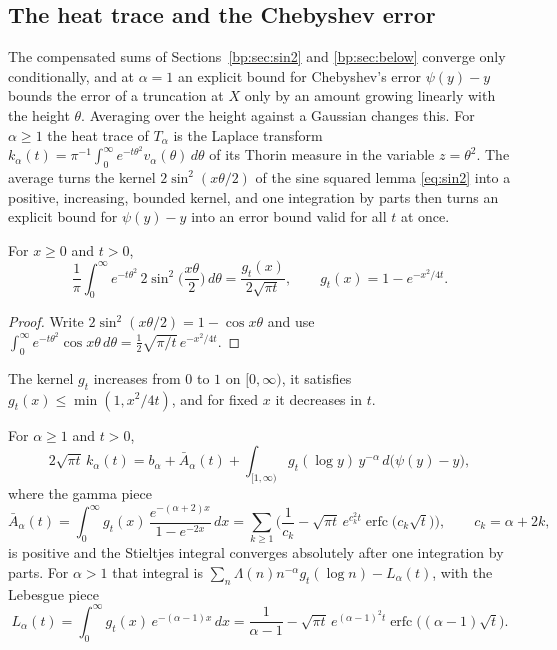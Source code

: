 \subsection{The heat trace and the Chebyshev error}\label{bp:sec:heat}

The compensated sums of Sections~\ref{bp:sec:sin2} and \ref{bp:sec:below} converge only conditionally, and at $\alpha=1$ an explicit bound for Chebyshev's error $\psi(y)-y$ bounds the error of a truncation at $X$ only by an amount growing linearly with the height $\theta$. Averaging over the height against a Gaussian changes this. For $\alpha\ge1$ the heat trace of $T_\alpha$ is the Laplace transform $k_\alpha(t)=\pi^{-1}\int_0^\infty e^{-t\theta^2}v_\alpha(\theta)\,d\theta$ of its Thorin measure in the variable $z=\theta^2$. The average turns the kernel $2\sin^2(x\theta/2)$ of the sine squared lemma \eqref{eq:sin2} into a positive, increasing, bounded kernel, and one integration by parts then turns an explicit bound for $\psi(y)-y$ into an error bound valid for all $t$ at once.

\begin{lemma}\label{bp:lem:gauss}
For $x\ge0$ and $t>0$,
\[
\frac1\pi\int_0^\infty e^{-t\theta^2}\,2\sin^2\Big(\frac{x\theta}2\Big)\,d\theta=\frac{g_t(x)}{2\sqrt{\pi t}},\qquad g_t(x)=1-e^{-x^2/4t}.
\]
\end{lemma}

\begin{proof}
Write $2\sin^2(x\theta/2)=1-\cos x\theta$ and use $\int_0^\infty e^{-t\theta^2}\cos x\theta\,d\theta=\frac12\sqrt{\pi/t}\,e^{-x^2/4t}$.
\end{proof}

The kernel $g_t$ increases from $0$ to $1$ on $[0,\infty)$, it satisfies $g_t(x)\le\min(1,x^2/4t)$, and for fixed $x$ it decreases in $t$.

\begin{proposition}\label{bp:prop:heat}
For $\alpha\ge1$ and $t>0$,
\begin{equation}\label{bp:eq:heat}
2\sqrt{\pi t}\,k_\alpha(t)=b_\alpha+\bar A_\alpha(t)+\int_{[1,\infty)}g_t(\log y)\,y^{-\alpha}\,d\big(\psi(y)-y\big),
\end{equation}
where the gamma piece
\[
\bar A_\alpha(t)=\int_0^\infty g_t(x)\,\frac{e^{-(\alpha+2)x}}{1-e^{-2x}}\,dx=\sum_{k\ge1}\Big(\frac1{c_k}-\sqrt{\pi t}\,e^{c_k^2t}\operatorname{erfc}\big(c_k\sqrt t\big)\Big),\qquad c_k=\alpha+2k,
\]
is positive and the Stieltjes integral converges absolutely after one integration by parts. For $\alpha>1$ that integral is $\sum_n\Lambda(n)n^{-\alpha}g_t(\log n)-L_\alpha(t)$, with the Lebesgue piece
\[
L_\alpha(t)=\int_0^\infty g_t(x)\,e^{-(\alpha-1)x}\,dx=\frac1{\alpha-1}-\sqrt{\pi t}\,e^{(\alpha-1)^2t}\operatorname{erfc}\big((\alpha-1)\sqrt t\big).
\]
\end{proposition}

